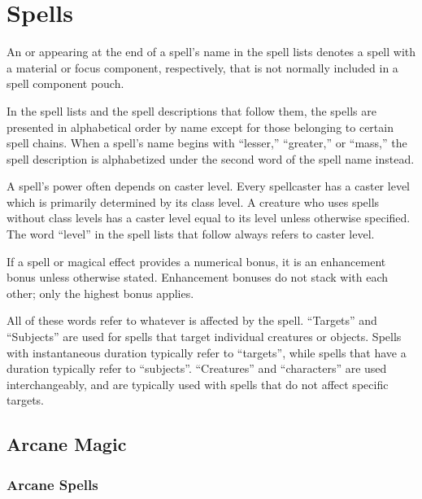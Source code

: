 \chapter{Spells}

An \M{} or \F{} appearing at the end of a spell's name in the spell lists denotes a spell with a material or focus component, respectively, that is not normally included in a spell component pouch.

 In the spell lists and the spell descriptions that follow them, the spells are presented in alphabetical order by name except for those belonging to certain spell chains.
When a spell's name begins with ``lesser,'' ``greater,'' or ``mass,'' the spell description is alphabetized under the second word of the spell name instead.

 A spell's power often depends on caster level. Every spellcaster has a caster level which is primarily determined by its class level. A creature who uses spells without class levels has a caster level equal to its level unless otherwise specified. The word ``level'' in the spell lists that follow always refers to caster level.

 If a spell or magical effect provides a numerical bonus, it is an enhancement bonus unless otherwise stated. Enhancement bonuses do not stack with each other; only the highest bonus applies.

 All of these words refer to whatever is affected by the spell. ``Targets'' and ``Subjects'' are used for spells that target individual creatures or objects. Spells with instantaneous duration typically refer to ``targets'', while spells that have a duration typically refer to ``subjects''. ``Creatures'' and ``characters'' are used interchangeably, and are typically used with spells that do not affect specific targets.

\small

\section{Arcane Magic}\label{Arcane Magic}

\subsection{Arcane Spells}\label{Arcane Spells}
